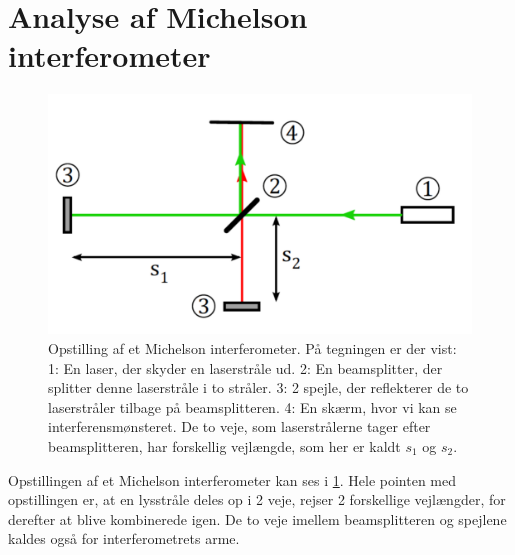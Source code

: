 \documentclass[crop=false, class=memoir]{standalone}
\begin{document}
\section{Analyse af Michelson interferometer}
%
\begin{figure}
    \centering
    \includegraphics[width=0.5\linewidth]{Laserfysik/billeder/Setup.PNG}
    \caption{Opstilling af et Michelson interferometer. På tegningen er der vist: 1: En laser, der skyder en laserstråle ud. 2: En beamsplitter, der splitter denne laserstråle i to stråler. 3: 2 spejle, der reflekterer de to laserstråler tilbage på beamsplitteren. 4: En skærm, hvor vi kan se interferensmønsteret. De to veje, som laserstrålerne tager efter beamsplitteren, har forskellig vejlængde, som her er kaldt $s_1$ og $s_2$.}
    \label{fig:michelsonInterferometer}
\end{figure}
%
Opstillingen af et Michelson interferometer kan ses i \cref{fig:michelsonInterferometer}. Hele pointen med opstillingen er, at en lysstråle deles op i 2 veje, rejser 2 forskellige vejlængder, for derefter at blive kombinerede igen. De to veje imellem beamsplitteren og spejlene kaldes også for interferometrets arme.
\end{document}
